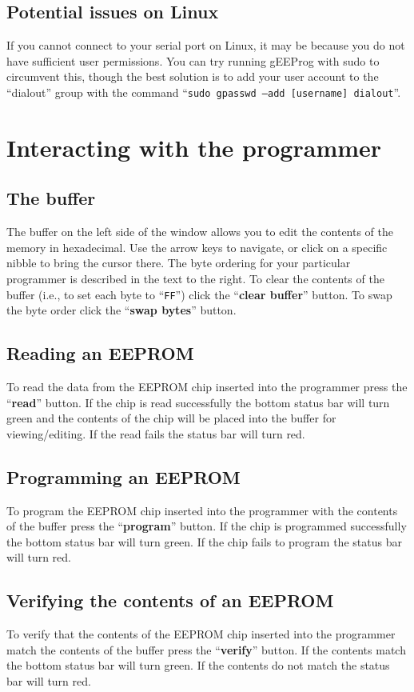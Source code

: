 \documentclass[letter]{article}
\begin{document}
\subsection*{Potential issues on Linux}
If you cannot connect to your serial port on Linux, it may be because you do not have sufficient user permissions.
You can try running gEEProg with sudo to circumvent this, though the best solution is to add your user account to the ``dialout'' group with the command ``\texttt{sudo gpasswd --add [username] dialout}''.

\section{Interacting with the programmer}
\subsection{The buffer}
The buffer on the left side of the window allows you to edit the contents of the memory in hexadecimal.
Use the arrow keys to navigate, or click on a specific nibble to bring the cursor there.
The byte ordering for your particular programmer is described in the text to the right.
To clear the contents of the buffer (i.e., to set each byte to ``\texttt{FF}'') click the ``\textbf{clear buffer}'' button.
To swap the byte order click the ``\textbf{swap bytes}'' button.

\subsection{Reading an EEPROM}
To read the data from the EEPROM chip inserted into the programmer press the ``\textbf{read}'' button.
If the chip is read successfully the bottom status bar will turn green and the contents of the chip will be placed into the buffer for viewing/editing.
If the read fails the status bar will turn red.

\subsection{Programming an EEPROM}
To program the EEPROM chip inserted into the programmer with the contents of the buffer press the ``\textbf{program}'' button.
If the chip is programmed successfully the bottom status bar will turn green.
If the chip fails to program the status bar will turn red.

\subsection{Verifying the contents of an EEPROM}
To verify that the contents of the EEPROM chip inserted into the programmer match the contents of the buffer press the ``\textbf{verify}'' button.
If the contents match the bottom status bar will turn green.
If the contents do not match the status bar will turn red.
\end{document}
